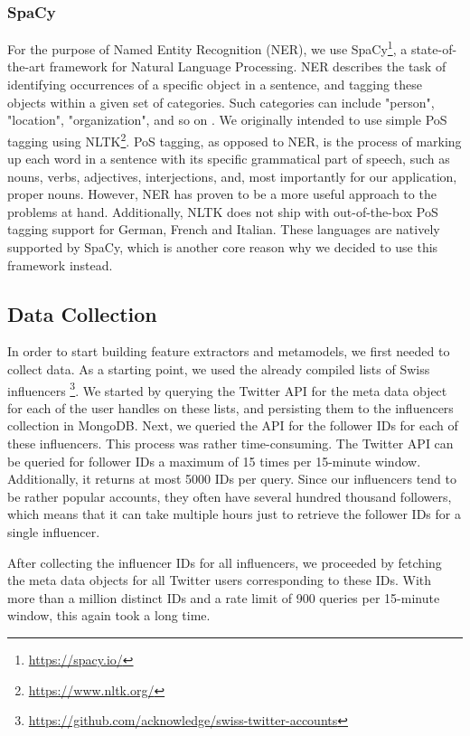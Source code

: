 \documentclass[10pt,a4paper]{article}
\begin{document}
\subsubsection{SpaCy}
For the purpose of Named Entity Recognition (NER), we use SpaCy\footnote{\href{https://spacy.io/}{https://spacy.io/}}, a state-of-the-art framework for Natural Language Processing. NER describes the task of identifying occurrences of a specific object in a sentence, and tagging these objects within a given set of categories. Such categories can include "person", "location", "organization", and so on \cite{lock09a}. We originally intended to use simple PoS tagging using NLTK\footnote{\href{https://www.nltk.org/}{https://www.nltk.org/}}. PoS tagging, as opposed to NER, is the process of marking up each word in a sentence with its specific grammatical part of speech, such as nouns, verbs, adjectives, interjections, and, most importantly for our application, proper nouns. However, NER has proven to be a more useful approach to the problems at hand. Additionally, NLTK does not ship with out-of-the-box PoS tagging support for German, French and Italian. These languages are natively supported by SpaCy, which is another core reason why we decided to use this framework instead.

\subsection{Data Collection}
In order to start building feature extractors and metamodels, we first needed to collect data. As a starting point, we used the already compiled lists of Swiss influencers \footnote{\href{https://github.com/acknowledge/swiss-twitter-accounts}{https://github.com/acknowledge/swiss-twitter-accounts}}. We started by querying the Twitter API for the meta data object for each of the user handles on these lists, and persisting them to the influencers collection in MongoDB. Next, we queried the API for the follower IDs for each of these influencers. This process was rather time-consuming. The Twitter API can be queried for follower IDs a maximum of 15 times per 15-minute window. Additionally, it returns at most 5000 IDs per query. Since our influencers tend to be rather popular accounts, they often have several hundred thousand followers, which means that it can take multiple hours just to retrieve the follower IDs for a single influencer.

After collecting the influencer IDs for all influencers, we proceeded by fetching the meta data objects for all Twitter users corresponding to these IDs. With more than a million distinct IDs and a rate limit of 900 queries per 15-minute window, this again took a long time.
\end{document}
